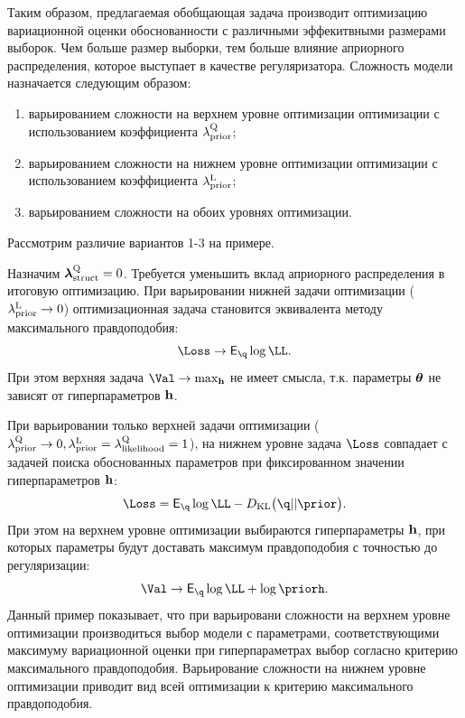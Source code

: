 Таким образом, предлагаемая обобщающая задача производит оптимизацию вариационной оценки обоснованности с различными  эффекитвными размерами выборок. Чем больше размер выборки, тем больше влияние априорного распределения, которое выступает в качестве регуляризатора. Сложность модели назначается следующим образом:
\begin{enumerate}
\item варьированием сложности на верхнем уровне оптимизации оптимизации с использованием коэффициента $\lambda_\text{prior}^\text{Q}$;
\item варьированием сложности на нижнем уровне оптимизации оптимизации с использованием коэффициента $\lambda_\text{prior}^\text{L}$;
\item варьированием сложности на обоих уровнях оптимизации.
\end{enumerate}
Рассмотрим различие вариантов 1-3 на примере.
\begin{example}
Назначим $\boldsymbol{\lambda}_\text{struct}^\text{Q} = 0$.
Требуется уменьшить вклад априорного распределения в итоговую оптимизацию.
При варьировании нижней задачи оптимизации ($\lambda_\text{prior}^\text{L} \to 0$) оптимизационная задача становится эквивалента методу максимального правдоподобия:
\[
   \Loss \to \E_{\q} \log \LL.
\]
При этом верхняя задача $\Val \to \max_{\h}$ не имеет смысла, т.к. параметры $\boldsymbol{\theta}$ не зависят от гиперпараметров $\mathbf{h}$.

При варьировании только верхней задачи оптимизации ($\lambda_\text{prior}^\text{Q} \to 0, \lambda_\text{prior}^\text{L} = \lambda_\text{likelihood}^\text{Q} = 1$), на нижнем уровне задача $\Loss$ совпадает с задачей поиска обоснованных параметров при фиксированном значении гиперпараметров $\mathbf{h}$:
\[
   \Loss = \E_{\q} \log \LL - \KL{\q}{\prior}.
\]
При этом на верхнем уровне оптимизации выбираются гиперпараметры $\mathbf{h}$, при которых параметры будут доставать максимум правдоподобия с точностью до регуляризации:
\[
    \Val \to \E_{\q} \log \LL  + \log \priorh.
\]
Данный пример показывает, что при варьировани  сложности на верхнем уровне оптимизации  производиться выбор модели с параметрами, соответствующими максимуму вариационной оценки при гиперпараметрах выбор согласно критерию максимального правдоподобия. Варьирование сложности на нижнем уровне оптимизации приводит вид всей оптимизации к критерию максимального правдоподобия. 
\end{example}

